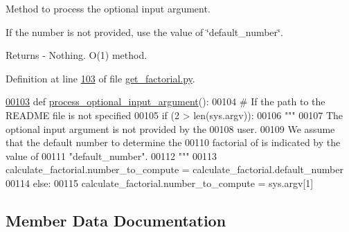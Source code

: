 Method to process the optional input argument. 

If the number is not provided, use the value of \char`\"{}default\+\_\+number\char`\"{}. \begin{DoxyReturn}{Returns}
-\/ Nothing. O(1) method. 
\end{DoxyReturn}


Definition at line \hyperlink{get__factorial_8py_source_l00103}{103} of file \hyperlink{get__factorial_8py_source}{get\+\_\+factorial.\+py}.


\begin{DoxyCode}
\hypertarget{classutilities_1_1timing__measurements_1_1get__factorial_1_1calculate__factorial_l00103}{}\hyperlink{classutilities_1_1timing__measurements_1_1get__factorial_1_1calculate__factorial_a799aaf842a0c6c98d31ee1cad8381caa}{00103}     \textcolor{keyword}{def }\hyperlink{classutilities_1_1timing__measurements_1_1get__factorial_1_1calculate__factorial_a799aaf842a0c6c98d31ee1cad8381caa}{process\_optional\_input\_argument}():
00104         \textcolor{comment}{# If the path to the README file is not specified}
00105         \textcolor{keywordflow}{if} (2 > len(sys.argv)):
00106             \textcolor{stringliteral}{"""}
00107 \textcolor{stringliteral}{                The optional input argument is not provided by the}
00108 \textcolor{stringliteral}{                    user.}
00109 \textcolor{stringliteral}{                We assume that the default number to determine the}
00110 \textcolor{stringliteral}{                    factorial of is indicated by the value of}
00111 \textcolor{stringliteral}{                    "default\_number".}
00112 \textcolor{stringliteral}{            """}
00113             calculate\_factorial.number\_to\_compute = calculate\_factorial.default\_number
00114         \textcolor{keywordflow}{else}:
00115             calculate\_factorial.number\_to\_compute = sys.argv[1]
\end{DoxyCode}


\subsection{Member Data Documentation}
\hypertarget{classutilities_1_1timing__measurements_1_1get__factorial_1_1calculate__factorial_a52e3407bbd93719d9c77e49706a47362}{}

